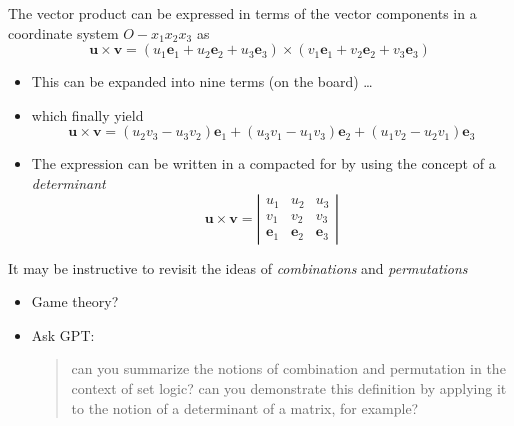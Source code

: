 \documentclass[11pt]{article}
\begin{document}
The vector product can be expressed in terms of the vector components in  a coordinate system \(O-x_1 x_2 x_3\) as
  $$ \boldsymbol{u} \times \boldsymbol{v} =  (u_1 \boldsymbol{e}_1 + u_2 \boldsymbol{e}_2 + u_3 \boldsymbol{e}_3) \times (v_1 \boldsymbol{e}_1 + v_2 \boldsymbol{e}_2 + v_3 \boldsymbol{e}_3) $$  
\begin{itemize}
\item This can be expanded into nine terms (on the board) \ldots{}
\item which finally yield 
$$ \boldsymbol{u} \times \boldsymbol{v} =  (u_2 v_3 - u_3 v_2) \boldsymbol{e}_1 + (u_3 v_1 - u_1 v_3) \boldsymbol{e}_2 + (u_1 v_2 - u_2 v_1) \boldsymbol{e}_3 $$
\item The expression can be written in a compacted for by using the concept of a \emph{determinant}
$$ \boldsymbol{u} \times \boldsymbol{v} = \left| \begin{matrix} u_1 & u_2 & u_3 \\ v_1 & v_2 & v_3 \\ \boldsymbol{e}_1 & \boldsymbol{e}_2 & \boldsymbol{e}_3 \end{matrix} \right| $$
\end{itemize}

It may be instructive to revisit the ideas of \emph{combinations} and \emph{permutations}
\begin{itemize}
\item Game theory?
\item Ask GPT:
\begin{quote}
can you summarize the notions of combination and permutation in the context of set logic? can you demonstrate this definition by applying it to the notion of a determinant of a matrix, for example?
\end{quote}
\end{itemize}
\end{document}
